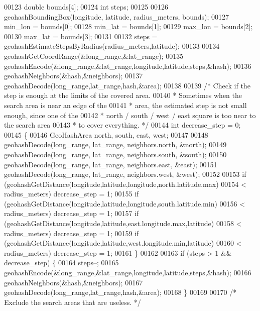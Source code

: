 \begin{DoxyCode}
00123     \textcolor{keywordtype}{double} bounds[4];
00124     \textcolor{keywordtype}{int} steps;
00125 
00126     geohashBoundingBox(longitude, latitude, radius\_meters, bounds);
00127     min\_lon = bounds[0];
00128     min\_lat = bounds[1];
00129     max\_lon = bounds[2];
00130     max\_lat = bounds[3];
00131 
00132     steps = geohashEstimateStepsByRadius(radius\_meters,latitude);
00133 
00134     geohashGetCoordRange(&long\_range,&lat\_range);
00135     geohashEncode(&long\_range,&lat\_range,longitude,latitude,steps,&hash);
00136     geohashNeighbors(&hash,&neighbors);
00137     geohashDecode(long\_range,lat\_range,hash,&area);
00138 
00139     \textcolor{comment}{/* Check if the step is enough at the limits of the covered area.}
00140 \textcolor{comment}{     * Sometimes when the search area is near an edge of the}
00141 \textcolor{comment}{     * area, the estimated step is not small enough, since one of the}
00142 \textcolor{comment}{     * north / south / west / east square is too near to the search area}
00143 \textcolor{comment}{     * to cover everything. */}
00144     \textcolor{keywordtype}{int} decrease\_step = 0;
00145     \{
00146         GeoHashArea north, south, east, west;
00147 
00148         geohashDecode(long\_range, lat\_range, neighbors.north, &north);
00149         geohashDecode(long\_range, lat\_range, neighbors.south, &south);
00150         geohashDecode(long\_range, lat\_range, neighbors.east, &east);
00151         geohashDecode(long\_range, lat\_range, neighbors.west, &west);
00152 
00153         \textcolor{keywordflow}{if} (geohashGetDistance(longitude,latitude,longitude,north.latitude.max)
00154             < radius\_meters) decrease\_step = 1;
00155         \textcolor{keywordflow}{if} (geohashGetDistance(longitude,latitude,longitude,south.latitude.min)
00156             < radius\_meters) decrease\_step = 1;
00157         \textcolor{keywordflow}{if} (geohashGetDistance(longitude,latitude,east.longitude.max,latitude)
00158             < radius\_meters) decrease\_step = 1;
00159         \textcolor{keywordflow}{if} (geohashGetDistance(longitude,latitude,west.longitude.min,latitude)
00160             < radius\_meters) decrease\_step = 1;
00161     \}
00162 
00163     \textcolor{keywordflow}{if} (steps > 1 && decrease\_step) \{
00164         steps--;
00165         geohashEncode(&long\_range,&lat\_range,longitude,latitude,steps,&hash);
00166         geohashNeighbors(&hash,&neighbors);
00167         geohashDecode(long\_range,lat\_range,hash,&area);
00168     \}
00169 
00170     \textcolor{comment}{/* Exclude the search areas that are useless. */}

\end{DoxyCode}
